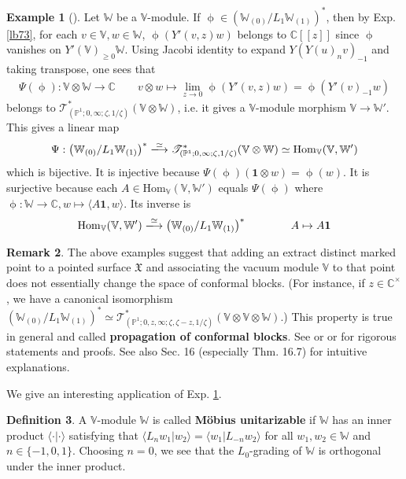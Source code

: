 \documentclass[11pt,b5paper,notitlepage]{article}
\theoremstyle{definition}
\newtheorem{df}{Definition}[section]
\newtheorem{eg}[df]{Example}
\newtheorem{rem}[df]{Remark}
\theoremstyle{plain}
\newcommand{\fk}{\mathfrak}
\newcommand{\id}{\mathbf{1}}
\newcommand{\Hom}{\mathrm{Hom}}
\newcommand{\bk}[1]{\langle {#1}\rangle}
\newcommand{\scr}{\mathscr}
\newcommand{\Vbb}{\mathbb V}
\newcommand{\Wbb}{\mathbb W}
\newcommand{\Cbb}{\mathbb C}
\newcommand{\Pbb}{\mathbb P}
\numberwithin{equation}{section}
\begin{document}
\begin{eg}[{\cite[Prop. 3.4]{Li94}}]\label{lb74}
Let $\Wbb$ be a $\Vbb$-module. If $\upphi\in \left(\Wbb_{(0)}/L_1\Wbb_{(1)}\right)^* $, then by Exp. \ref{lb73}, for each $v\in\Vbb,w\in\Wbb$, $\upphi(Y'(v,z)w)$ belongs to $\Cbb[[z]]$ since $\upphi$ vanishes on $Y'(\Vbb)_{\geq 0}\Wbb$. Using Jacobi identity to expand $Y(Y(u)_nv)_{-1}$ and taking transpose, one sees that
\begin{align}
\Psi(\upphi):\Vbb\otimes\Wbb\rightarrow\Cbb\qquad v\otimes w\mapsto \lim_{z\rightarrow 0}\upphi(Y'(v,z)w)=\upphi(Y'(v)_{-1}w)
\end{align} 
belongs to $\scr T^*_{(\Pbb^1;0,\infty;\zeta,1/\zeta)}(\Vbb\otimes\Wbb)$, i.e. it gives a $\Vbb$-module morphism $\Vbb\rightarrow\Wbb'$. This gives a linear map
\begin{align}
\Psi:\left(\Wbb_{(0)}/L_1\Wbb_{(1)}\right)^*\xlongrightarrow{\simeq}\scr T^*_{(\Pbb^1;0,\infty;\zeta,1/\zeta)}(\Vbb\otimes\Wbb)\simeq \Hom_\Vbb(\Vbb,\Wbb')
\end{align}
which is bijective. It is injective because $\Psi(\upphi)(\id\otimes w)=\upphi(w)$. It is surjective because each $A\in\Hom_\Vbb(\Vbb,\Wbb')$ equals $\Psi(\upphi)$ where $\upphi:\Wbb\rightarrow\Cbb,w\mapsto\bk{A\id,w}$. Its inverse is
\begin{align}
\Hom_\Vbb(\Vbb,\Wbb')\xlongrightarrow{\simeq}\left(\Wbb_{(0)}/L_1\Wbb_{(1)}\right)^*\qquad\qquad A\mapsto A\id
\end{align}
\end{eg}



\begin{rem}
The above examples suggest that adding an extract distinct marked point to a pointed surface $\fk X$ and associating the vacuum module $\Vbb$ to that point does not essentially change the space of conformal blocks. (For instance, if $z\in\Cbb^\times$, we have a canonical isomorphism $(\Wbb_{(0)}/L_1\Wbb_{(1)})^*\simeq \scr T^*_{(\Pbb^1;0,z,\infty;\zeta,\zeta-z,1/\zeta)}(\Vbb\otimes\Vbb\otimes\Wbb)$.) This property is true in general and called \textbf{propagation of conformal blocks}. See \cite[Thm. 6.1]{Zhu94} or \cite[Thm. 10.3.1]{FB04} or \cite[Cor. 7.5]{Gui21} for rigorous statements and proofs. See also \cite{Gui23b} Sec. 16 (especially Thm. 16.7) for intuitive explanations.
\end{rem}


We give an interesting application of Exp. \ref{lb74}.

\begin{df}
A $\Vbb$-module $\Wbb$ is called \textbf{M\"obius unitarizable} if $\Wbb$ has an inner product $\bk{\cdot|\cdot}$ satisfying that $\bk{L_nw_1|w_2}=\bk{w_1|L_{-n}w_2}$ for all $w_1,w_2\in\Wbb$ and $n\in\{-1,0,1\}$. Choosing $n=0$, we see that the $L_0$-grading of $\Wbb$ is orthogonal under the inner product.
\end{df}
\end{document}
